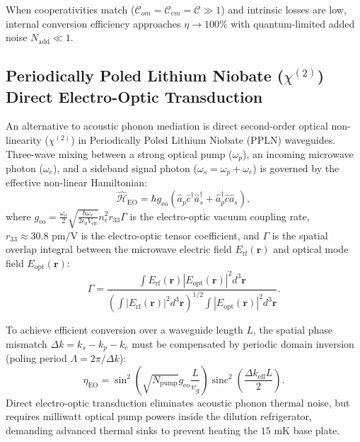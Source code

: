 When cooperativities match ($\mathcal{C}_{om} = \mathcal{C}_{em} = \mathcal{C} \gg 1$) and intrinsic losses are low, internal conversion efficiency approaches $\eta \to 100\%$ with quantum-limited added noise $N_{\text{add}} \ll 1$.

\subsection{Periodically Poled Lithium Niobate ($\chi^{(2)}$) Direct Electro-Optic Transduction}
An alternative to acoustic phonon mediation is direct second-order optical non-linearity ($\chi^{(2)}$) in Periodically Poled Lithium Niobate (PPLN) waveguides. Three-wave mixing between a strong optical pump ($\omega_p$), an incoming microwave photon ($\omega_e$), and a sideband signal photon ($\omega_s = \omega_p + \omega_e$) is governed by the effective non-linear Hamiltonian:
\begin{equation}
    \hat{\mathcal{H}}_{\text{EO}} = \hbar g_{\text{eo}} \left( \hat{a}_p \hat{c}^\dagger \hat{a}_s^\dagger + \hat{a}_p^\dagger \hat{c} \hat{a}_s \right),
\end{equation}
where $g_{\text{eo}} = \frac{\omega_o}{2} \sqrt{\frac{\hbar \omega_e}{2 \epsilon_0 V_{\text{eff}}}} n_e^2 r_{33} \Gamma$ is the electro-optic vacuum coupling rate, $r_{33} \approx 30.8\text{ pm/V}$ is the electro-optic tensor coefficient, and $\Gamma$ is the spatial overlap integral between the microwave electric field $E_{\text{rf}}(\mathbf{r})$ and optical mode field $E_{\text{opt}}(\mathbf{r})$:
\begin{equation}
    \Gamma = \frac{\int E_{\text{rf}}(\mathbf{r}) |E_{\text{opt}}(\mathbf{r})|^2 d^3\mathbf{r}}{\left( \int |E_{\text{rf}}(\mathbf{r})|^2 d^3\mathbf{r} \right)^{1/2} \int |E_{\text{opt}}(\mathbf{r})|^2 d^3\mathbf{r}}.
\end{equation}

To achieve efficient conversion over a waveguide length $L$, the spatial phase mismatch $\Delta k = k_s - k_p - k_e$ must be compensated by periodic domain inversion (poling period $\Lambda = 2\pi / \Delta k$):
\begin{equation}
    \eta_{\text{EO}} = \sin^2\left( \sqrt{N_{\text{pump}}} g_{\text{eo}} \frac{L}{v_g} \right) \operatorname{sinc}^2\left( \frac{\Delta k_{\text{eff}} L}{2} \right).
\end{equation}
Direct electro-optic transduction eliminates acoustic phonon thermal noise, but requires milliwatt optical pump powers inside the dilution refrigerator, demanding advanced thermal sinks to prevent heating the $15\text{ mK}$ base plate.

